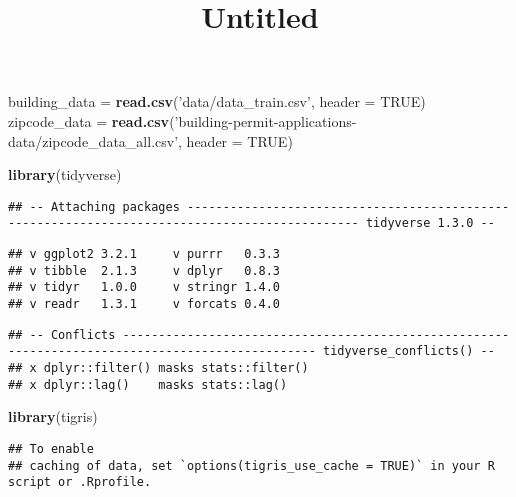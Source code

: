 \documentclass[]{article}
\title{Untitled}
\author{}
\date{}
\newenvironment{Shaded}{\begin{snugshade}}{\end{snugshade}}
\newcommand{\KeywordTok}[1]{\textcolor[rgb]{0.13,0.29,0.53}{\textbf{#1}}}
\newcommand{\DataTypeTok}[1]{\textcolor[rgb]{0.13,0.29,0.53}{#1}}
\newcommand{\StringTok}[1]{\textcolor[rgb]{0.31,0.60,0.02}{#1}}
\newcommand{\OtherTok}[1]{\textcolor[rgb]{0.56,0.35,0.01}{#1}}
\newcommand{\NormalTok}[1]{#1}
\begin{document}
\maketitle

\begin{Shaded}
\begin{Highlighting}[]
\NormalTok{building_data =}\StringTok{ }\KeywordTok{read.csv}\NormalTok{(}\StringTok{'data/data_train.csv'}\NormalTok{, }\DataTypeTok{header =} \OtherTok{TRUE}\NormalTok{)}
\NormalTok{zipcode_data =}\StringTok{ }\KeywordTok{read.csv}\NormalTok{(}\StringTok{'building-permit-applications-data/zipcode_data_all.csv'}\NormalTok{, }\DataTypeTok{header =} \OtherTok{TRUE}\NormalTok{)}
\end{Highlighting}
\end{Shaded}

\begin{Shaded}
\begin{Highlighting}[]
\KeywordTok{library}\NormalTok{(tidyverse)}
\end{Highlighting}
\end{Shaded}

\begin{verbatim}
## -- Attaching packages ---------------------------------------------------------------------------------------------- tidyverse 1.3.0 --
\end{verbatim}

\begin{verbatim}
## v ggplot2 3.2.1     v purrr   0.3.3
## v tibble  2.1.3     v dplyr   0.8.3
## v tidyr   1.0.0     v stringr 1.4.0
## v readr   1.3.1     v forcats 0.4.0
\end{verbatim}

\begin{verbatim}
## -- Conflicts ------------------------------------------------------------------------------------------------- tidyverse_conflicts() --
## x dplyr::filter() masks stats::filter()
## x dplyr::lag()    masks stats::lag()
\end{verbatim}

\begin{Shaded}
\begin{Highlighting}[]
\KeywordTok{library}\NormalTok{(tigris)}
\end{Highlighting}
\end{Shaded}

\begin{verbatim}
## To enable 
## caching of data, set `options(tigris_use_cache = TRUE)` in your R script or .Rprofile.
\end{verbatim}
\end{document}
